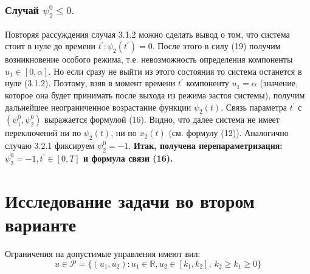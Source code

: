 \documentclass[11pt]{article}
\begin{document}
{{\subsubsection{Случай $\psi_2^0 \leq 0.$}
Повторяя рассуждения случая 3.1.2  можно сделать вывод о том, что система стоит в нуле до времени $t^{'}:\psi_2(t^{'}) = 0.$ После этого в силу (19) получим возникновение особого режима, т.е. невозможность определения компоненты $u_1 \in [0,\alpha].$ Но если сразу не выйти из этого состояния то система останется в нуле (3.1.2). Поэтому, взяв в момент времени $t^{'}$ компоненту $u_1 = \alpha$ (значение, которое она будет принимать после выхода из  режима застоя системы), получим дальнейшее неограниченное возрастание функции $\psi_2(t)$. Связь параметра $t^{'}$ с $(\psi_1^0, \psi_2^0)$ выражается формулой (16). Видно, что далее система не имеет переключений ни по $\psi_2(t)$, ни по $x_2(t)$ (см. формулу (12)). Аналогично случаю 3.2.1 фиксируем $\psi_2^0 = -1.$ 
\newline
\textbf{Итак, получена перепараметризация: $\psi_2^0 = -1, 
	t^{'} \in [0, T]$ и формула связи (16).}
}

\section{Исследование задачи во втором варианте}
{Ограничения на допустимые управления имеют вил:
\[ u \in \mathcal{P} = \{ (u_1,u_2):u_1 \in \mathbb{R}, u_2 \in [k_1,k_2], \ k_2 \geq k_1 \geq 0 \} \]
}}
\end{document}
